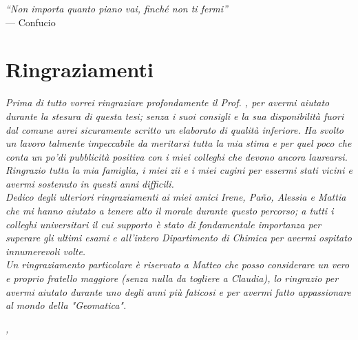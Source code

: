 \cleardoublepage
{}
{}

\begin{flushright}{
    \slshape
    ``Non importa quanto piano vai, finché non ti fermi''} \\
    \medskip
    --- Confucio
\end{flushright}


\bigskip

\begingroup
\let\clearpage\relax
\let\cleardoublepage\relax
\let\cleardoublepage\relax

\chapter*{Ringraziamenti}

\noindent \textit{
    Prima di tutto vorrei ringraziare profondamente il Prof. \myProf, per avermi aiutato durante la stesura di questa tesi; senza i suoi consigli e la sua disponibilità fuori dal comune avrei sicuramente scritto un elaborato di qualità inferiore. Ha svolto un lavoro talmente impeccabile da meritarsi tutta la mia stima e per quel poco che conta un po'di pubblicità positiva con i miei colleghi che devono ancora laurearsi.
    }\\

\noindent \textit{
    Ringrazio tutta la mia famiglia, i miei zii e i miei cugini per essermi stati vicini e avermi sostenuto in questi anni difficili.
    }\\

\noindent \textit{
    Dedico degli ulteriori ringraziamenti ai miei amici Irene, Paño, Alessia e Mattia che mi hanno aiutato a tenere alto il morale durante questo percorso; a tutti i colleghi universitari il cui supporto è stato di fondamentale importanza per superare gli ultimi esami e all'intero Dipartimento di Chimica per avermi ospitato innumerevoli volte.  
    }\\

\noindent \textit{
    Un ringraziamento particolare è riservato a Matteo che posso considerare un vero e proprio fratello maggiore (senza nulla da togliere a Claudia), lo ringrazio per avermi aiutato durante uno degli anni più faticosi e per avermi fatto appassionare al mondo della "Geomatica".
    }\\
\bigskip

\noindent\textit{\myLocation, \myTime}
\hfill \myName

\endgroup
